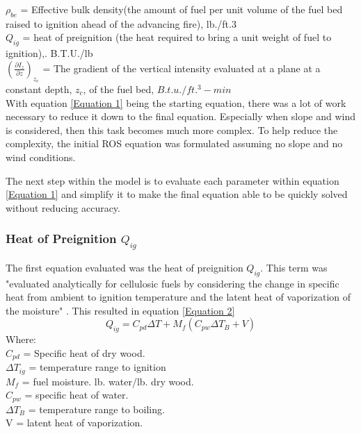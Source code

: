 \documentclass{article}
\begin{document}
\noindent $\rho_{be}$ = Effective bulk density(the amount of fuel per unit volume of the fuel bed raised to ignition ahead of the advancing fire), lb./ft.3 \\

\noindent $Q_{ig}$ = heat of preignition (the heat required to bring a unit weight of fuel to ignition),. B.T.U./lb \\

\noindent $(\frac {\partial {I_z}} {\partial z})_{z_c}$ = The gradient of the vertical intensity evaluated at a plane at a constant depth, $z_c$, of the fuel bed, $B.t.u./ft.^3 -min$ \\


\indent With equation \ref{Equation 1} being the starting equation, there was a lot of work necessary to reduce it down to the final equation. Especially when slope and wind is considered, then this task becomes much more complex. To help reduce the complexity, the initial ROS equation was formulated assuming no slope and no wind conditions. 

\indent The next step within the model is to evaluate each parameter within equation \ref{Equation 1} and simplify it to make the final equation able to be quickly solved without reducing accuracy. \\
\subsubsection{Heat of Preignition $Q_{ig}$}
\indent The first equation evaluated was the heat of preignition $Q_{ig}$. This term was "evaluated analytically for cellulosic fuels by considering the change in specific heat from ambient to ignition temperature and the latent heat of vaporization of the moisture" \citep{Rothermel1972}. This resulted in equation \ref{Equation 2}
\begin{equation}
	Q_{ig} = C_{pd}\Delta T + M_f (C_{pw} \Delta T_B + V)
	\label{Equation 2}
\end{equation}
Where: \\
$C_{pd}$ = Specific heat of dry wood. \\
$\Delta T_{ig}$ = temperature range to ignition \\
$M_f$ = fuel moisture. lb. water/lb. dry wood. \\
$C_{pw}$ = specific heat of water. \\
$\Delta T_B$ = temperature range to boiling. \\
V = latent heat of vaporization. \\
\end{document}
